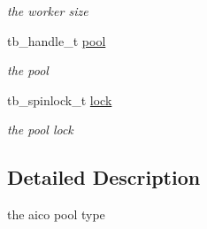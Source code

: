 \begin{DoxyCompactItemize}
\begin{DoxyCompactList}\small\item\em the worker size \end{DoxyCompactList}\item 
\hypertarget{structtb__aicp__t_ad57cd4cec762b8bbbaae7cccd331addb}{tb\-\_\-handle\-\_\-t \hyperlink{structtb__aicp__t_ad57cd4cec762b8bbbaae7cccd331addb}{pool}}\label{structtb__aicp__t_ad57cd4cec762b8bbbaae7cccd331addb}

\begin{DoxyCompactList}\small\item\em the pool \end{DoxyCompactList}\item 
\hypertarget{structtb__aicp__t_ac13412f06d6d70b51ba0c8d70f7e8c07}{tb\-\_\-spinlock\-\_\-t \hyperlink{structtb__aicp__t_ac13412f06d6d70b51ba0c8d70f7e8c07}{lock}}\label{structtb__aicp__t_ac13412f06d6d70b51ba0c8d70f7e8c07}

\begin{DoxyCompactList}\small\item\em the pool lock \end{DoxyCompactList}\end{DoxyCompactItemize}


\subsection{Detailed Description}
the aico pool type


